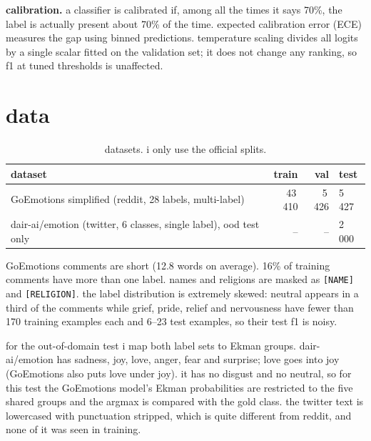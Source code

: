 \textbf{calibration.} a classifier is calibrated if, among all the times it says 70\%, the label is
actually present about 70\% of the time. expected calibration error (ECE) measures the gap using binned
predictions. temperature scaling \cite{guo} divides all logits by a single scalar fitted on the validation
set; it does not change any ranking, so f1 at tuned thresholds is unaffected.

\section{data}

\begin{table}[H]
\centering\small
\begin{tabular}{lrrl}
\toprule
dataset & train & val & test \\
\midrule
GoEmotions simplified (reddit, 28 labels, multi-label) & 43\,410 & 5\,426 & 5\,427 \\
dair-ai/emotion (twitter, 6 classes, single label), ood test only & -- & -- & 2\,000 \\
\bottomrule
\end{tabular}
\caption{datasets. i only use the official splits.}
\end{table}

GoEmotions comments are short (12.8 words on average). 16\% of training comments have more than one label.
names and religions are masked as \texttt{[NAME]} and \texttt{[RELIGION]}. the label distribution is
extremely skewed: neutral appears in a third of the comments while grief, pride, relief and nervousness have
fewer than 170 training examples each and 6--23 test examples, so their test f1 is noisy.

for the out-of-domain test i map both label sets to Ekman groups. dair-ai/emotion has sadness, joy, love,
anger, fear and surprise; love goes into joy (GoEmotions also puts love under joy). it has no disgust and no
neutral, so for this test the GoEmotions model's Ekman probabilities are restricted to the five shared
groups and the argmax is compared with the gold class. the twitter text is lowercased with punctuation
stripped, which is quite different from reddit, and none of it was seen in training.
